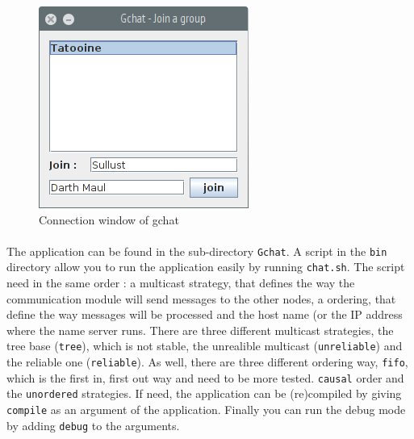 \begin{figure}[h]
    \begin{center}
        \includegraphics[scale=0.6]{figures/gchat_connection.png}
    \end{center}
    \caption{Connection window of gchat}
    \label{fig:gchat_connect}
\end{figure}

\paragraph{}{
    The application can be found in the sub-directory \texttt{Gchat}. 
 A script in the \texttt{bin} directory allow you to run the application easily
 by running \texttt{chat.sh}. The script need in the same order : a multicast 
 strategy, that defines the way the communication module will send messages to
 the other nodes, a ordering, that define the way messages will be processed and
 the host name (or the IP address where the name server runs. \newline 
 There are three different multicast strategies, the tree base (\texttt{tree}),
 which is not stable, the unrealible multicast (\texttt{unreliable}) and the
 reliable one (\texttt{reliable}). \newline
 As well, there are three different ordering way, \texttt{fifo}, which is the
 first in, first out way and need to be more tested. \texttt{causal} order and
 the \texttt{unordered} strategies. \newline
 If need, the application can be (re)compiled by giving \texttt{compile} as an
 argument of the application. Finally you can run the debug mode by adding 
 \texttt{debug} to the arguments.
}



